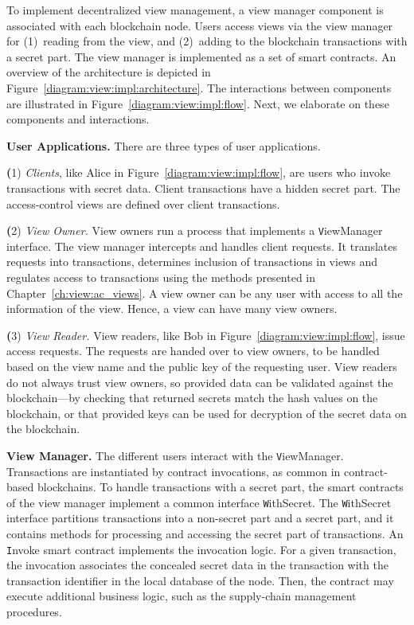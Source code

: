 To implement decentralized view management, a view manager component is associated with each blockchain node. Users access views via the view manager for (1)~reading from the view, and (2)~adding to the blockchain transactions with a secret part. The view manager is implemented as a set of smart contracts. An overview of the architecture is depicted in Figure~\ref{diagram:view:impl:architecture}. The interactions between components are illustrated in Figure~\ref{diagram:view:impl:flow}. Next, we elaborate on these components and interactions.




\smallskip
\noindent
\textbf{User Applications.}
There are three types of user applications.

\noindent
{\textbf (1)} \textit{Clients}, like Alice in Figure~\ref{diagram:view:impl:flow}, are users who invoke transactions with secret data. Client transactions have a hidden secret part. The access-control views are defined over client transactions.

\noindent
{\textbf (2)} \textit{View Owner.} View owners run a process that implements a {\texttt ViewManager} interface. 
The view manager intercepts and handles client requests. It translates requests into transactions, determines inclusion of transactions in views and regulates access to transactions using the methods presented in Chapter~\ref{ch:view:ac_views}. A view owner can be any user with access to all the information of the view. Hence, a view can have many view owners.

\noindent
{\textbf (3)} 
\textit{View Reader.} View readers, like Bob in Figure~\ref{diagram:view:impl:flow}, issue access requests. The requests are handed over to view owners, to be handled based on the view name and the public key of the requesting user. View readers do not always trust view owners, so provided data can be validated against the blockchain---by checking that returned secrets match the hash values on the blockchain, or that provided keys can be used for decryption of the secret data on the blockchain.  

\smallskip
\noindent
\textbf{View Manager.} The different users interact with the {\texttt ViewManager}. 
Transactions are instantiated by contract invocations, as common in contract-based blockchains. To handle transactions with a secret part, the smart contracts of the view manager implement a common interface {\texttt WithSecret}.
The {\texttt WithSecret} interface partitions transactions into a non-secret part and a secret part, and it contains methods for processing and accessing the secret part of transactions. An {\texttt Invoke} smart contract implements the invocation logic. For a given transaction, the invocation associates the concealed secret data in the transaction with the transaction identifier in the local database of the node. 
Then, the contract may execute additional business logic, such as the supply-chain management procedures.

